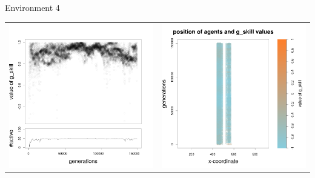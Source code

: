 \documentclass[8pt, handout=show,notes=show]{beamer}
\begin{document}
\begin{frame}{Environment 4}
\begin{table}[H]
\centering
\begin{tabular}{cc}
\includegraphics[width=\imgSize]{../images/5StaticEnv/Gplot17_staticEnv4}&\includegraphics[width=\imgSize]{../images/5StaticEnv/Gplot17Static_staticEnv4}\\

\end{tabular}
\end{table}
\end{frame}
\end{document}
